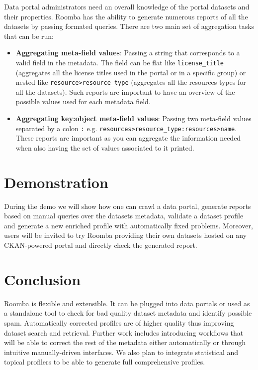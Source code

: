 \documentclass{sig-alternate}
\begin{document}
Data portal administrators need an overall knowledge of the portal datasets and their properties. Roomba has the ability to generate numerous reports of all the datasets by passing formated queries. There are two main set of aggregation tasks that can be run:
\begin{itemize}
  \item \textbf{Aggregating meta-field values}: Passing a string that corresponds to a valid field in the metadata. The field can be flat like \texttt{license\_title} (aggregates all the license titles used in the portal or in a specific group) or nested like \texttt{resource>resource\_type} (aggregates all the resources types for all the datasets). Such reports are important to have an overview of the possible values used for each metadata field.
  \item \textbf{Aggregating key:object meta-field values}: Passing two meta-field values separated by a colon \texttt{:} e.g. \texttt{resources>resource\_type:resources>name}. These reports are important as you can aggregate the information needed when also having the set of values associated to it printed.
\end{itemize}

\section{Demonstration}
During the demo we will show how one can crawl a data portal, generate reports based on manual queries over the datasets metadata, validate a dataset profile and generate a new enriched profile with automatically fixed problems. Moreover, users will be invited to try Roomba providing their own datasets hosted on any CKAN-powered portal and directly check the generated report.

\section{Conclusion}
Roomba is flexible and extensible. It can be plugged into data portals or used as a standalone tool to check for bad quality dataset metadata and identify possible spam. Automatically corrected profiles are of higher quality thus improving dataset search and retrieval. Further work includes introducing workflows that will be able to correct the rest of the metadata either automatically or through intuitive manually-driven interfaces. We also plan to integrate statistical and topical profilers to be able to generate full comprehensive profiles.



\end{document}
